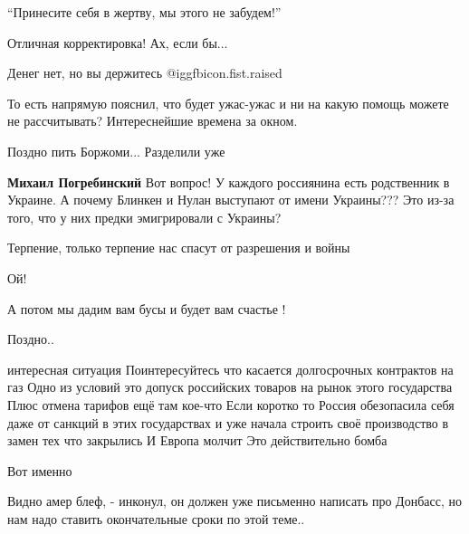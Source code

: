  
 
 
 
 
\zzSecCmt

\begin{itemize} %
\enquote{Принесите себя в жертву, мы этого не забудем!}

Отличная корректировка! Ах, если бы...

Денег нет, но вы держитесь  @igg{fbicon.fist.raised} 

То есть напрямую пояснил, что будет ужас-ужас и ни на какую помощь можете не рассчитывать? Интереснейшие времена за окном.

Поздно пить Боржоми... Разделили уже

\textbf{Михаил Погребинский}
Вот вопрос!
У каждого россиянина есть родственник в Украине.
А почему Блинкен и Нулан выступают от имени Украины???
Это из-за того, что у них предки эмигрировали с Украины?

Терпение, только терпение нас спасут от разрешения и войны

Ой!

А потом мы дадим вам бусы и будет вам счастье !

Поздно..

интересная ситуация
Поинтересуйтесь что касается долгосрочных контрактов на газ
Одно из условий это допуск российских товаров на рынок этого государства
Плюс отмена тарифов ещё там кое-что
Если коротко то Россия обезопасила себя даже от санкций в этих государствах и уже начала строить своё производство в замен тех что закрылись
И Европа молчит
Это действительно бомба

Вот именно


Видно амер блеф, - инконул, он должен уже письменно написать про Донбасс, но
нам надо ставить окончательные сроки по этой теме..



\end{itemize}
